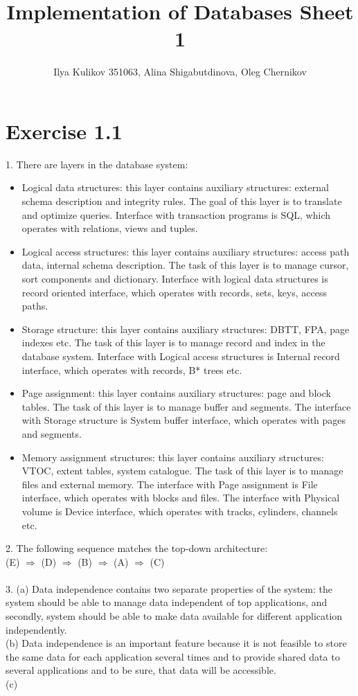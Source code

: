 \documentclass[10pt]{article}
\title{Implementation of Databases Sheet 1}
\author{Ilya Kulikov 351063, Alina Shigabutdinova, Oleg Chernikov}
\begin{document}
  \maketitle
  \section*{Exercise 1.1}
  1. There are layers in the database system:
  \begin{itemize}
    \item Logical data structures: this layer contains auxiliary structures:
    external schema description and integrity rules. The goal of this layer is
    to translate and optimize queries. Interface with transaction programs is
    SQL, which operates with relations, views and tuples.
    \item Logical access structures: this layer contains auxiliary structures:
    access path data, internal schema description. The task of this layer is to
    manage cursor, sort components and dictionary. Interface with logical data
    structures is record oriented interface, which operates with records, sets,
    keys, access paths.
    \item Storage structure: this layer contains auxiliary structures: DBTT, FPA,
    page indexes etc. The task of this layer is to manage record and index in the
    database system. Interface with Logical access structures is Internal record
    interface, which operates with records, B* trees etc.
    \item Page assignment: this layer contains auxiliary structures: page and
    block tables. The task of this layer is to manage buffer and segments. The
    interface with Storage structure is System buffer interface, which operates
    with pages and segments.
    \item Memory assignment structures: this layer contains auxiliary structures:
    VTOC, extent tables, system catalogue. The task of this layer is to manage files
    and external memory. The interface with Page assignment is File interface,
    which operates with blocks and files. The interface with Physical volume is
    Device interface, which operates with tracks, cylinders, channels etc.
  \end{itemize}
  2. The following sequence matches the top-down architecture:\\
  (E) $\Rightarrow$ (D) $\Rightarrow$ (B) $\Rightarrow$ (A) $\Rightarrow$ (C)\\\\
  3. (a) Data independence contains two separate properties of the system: the system
  should be able to manage data independent of top applications, and secondly,
  system should be able to make data available for different application independently.\\
  (b) Data independence is an important feature because it is not feasible to store
  the same data for each application several times and to provide shared data to
  several applications and to be sure, that data will be accessible.\\
  (c)
\end{document}

